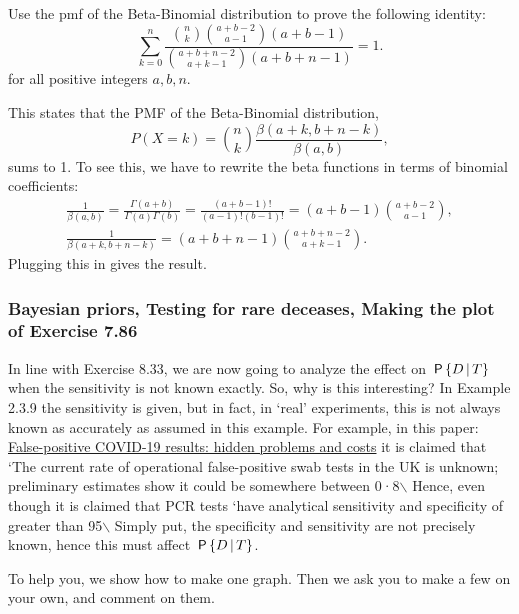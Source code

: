 \documentclass[../../assignments/assignments]{subfiles}
\begin{document}
\begin{exercise}
Use the pmf of the Beta-Binomial distribution to prove the following identity:
\begin{equation*}
   \sum_{k=0}^n \frac{\binom{n}{k}\binom{a+b-2}{a-1}  (a+b-1) }{\binom{a+b+n-2}{a+k-1}(a+b+n-1)} = 1.
\end{equation*}
for all positive integers $a, b, n$.
\begin{solution}
This  states that the PMF of the Beta-Binomial distribution, $$P(X=k) = \binom{n}{k} \frac{\beta(a+k,b+n-k)}{\beta(a,b)},$$ sums to 1. To see this, we have to rewrite the beta functions in terms of binomial coefficients:
\begin{align*}
   \frac{1}{\beta(a,b)} = \frac{\Gamma(a+b)}{\Gamma(a)\Gamma(b)} = \frac{(a+b-1)!}{(a-1)! (b-1)!} = (a+b-1) \binom{a+b-2}{a-1}, \\
   \frac{1}{\beta(a+k,b+n-k)}  = (a+b+n-1) \binom{a+b+n-2}{a+k-1}.
\end{align*}
Plugging this in gives the result.
\end{solution}
\end{exercise}

\subsubsection{Bayesian priors, Testing for rare deceases, Making the plot of Exercise 7.86}

In line with Exercise 8.33, we are now going to analyze the effect on \(\,\mathsf{P}\left\{D\,\middle|\, T\right\}\) when the sensitivity is not known exactly.
So, why is this interesting?
In Example 2.3.9 the sensitivity is given, but in fact, in `real' experiments, this is not always known as accurately as assumed in this example.
For example, in this paper: \href{https://www.thelancet.com/journals/lanres/article/PIIS2213-2600(20)30453-7/fulltext}{False-positive COVID-19 results: hidden problems and costs} it is claimed that `The current rate of operational false-positive swab tests in the UK is unknown; preliminary estimates show it could be somewhere between 0·8$\backslash$%
Hence, even though it is claimed that PCR tests `have analytical sensitivity and specificity of greater than 95$\backslash$%
Simply put, the specificity and sensitivity are not precisely known, hence this must affect \(\,\mathsf{P}\left\{D\,\middle|\, T\right\}\).

To help you, we show how to make one graph. Then we ask you to make a few on your own, and comment on them.
\end{document}
